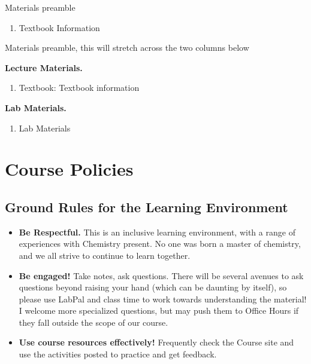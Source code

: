 \documentclass{article}
\begin{document}
\begin{tcolorbox}[width=\textwidth,colback={white},
title={\textbf{Course Materials}},
colbacktitle=color2!10,
coltitle=color1]    
Materials preamble
	\begin{enumerate}[noitemsep]
		\item{Textbook Information}
	\end{enumerate}
\end{tcolorbox}  

\begin{tcolorbox}[width=\textwidth,colback={white},
title={\textbf{Course Materials}},
colbacktitle=color2!10,
coltitle=color1] 

Materials preamble, this will stretch across the two columns below

\begin{multicols}{2}

\textbf{Lecture Materials.}
	\begin{enumerate}[noitemsep]
   		\item{Textbook: Textbook information}
	\end{enumerate}
\columnbreak
\textbf{Lab Materials.}
	\begin{enumerate}[noitemsep]
   		\item{Lab Materials}
	\end{enumerate}

\end{multicols}
\end{tcolorbox} 


\section*{Course Policies}

\subsection*{Ground Rules for the Learning Environment}
\begin{itemize}[noitemsep]
	\item{\textbf{Be Respectful.}  This is an inclusive learning environment, with a range of experiences with Chemistry present.  No one was born a master of chemistry, and we all strive to continue to learn together.}
	\item{\textbf{Be engaged!} Take notes, ask questions. There will be several avenues to ask questions beyond raising your hand (which can be daunting by itself), so please use LabPal and class time to work towards understanding the material! I welcome more specialized questions, but may push them to Office Hours if they fall outside the scope of our course.}
	\item{\textbf{Use course resources effectively!} Frequently check the Course site and use the activities posted to practice and get feedback.}
\end{itemize}
\end{document}

